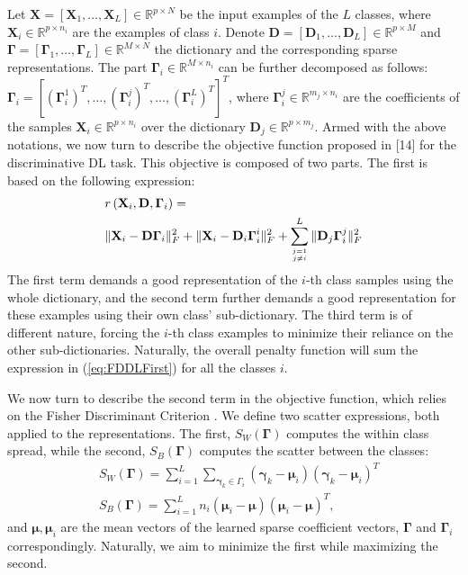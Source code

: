 \documentclass[journal]{IEEEtran}
\newcommand{\bD}{\mathbf{D}}
\newcommand{\bX}{\mathbf{X}}
\newcommand{\bGamma}{\boldsymbol{\Gamma}}
\newcommand{\bgamma}{\boldsymbol{\gamma}}
\newcommand{\bmu}{\boldsymbol{\mu}}
\begin{document}
Let $\bX = \left[\bX_1,\ldots,\bX_L\right] \in \mathbb{R}^{p \times N}$ be the input examples of the $L$ classes, where $\bX_i \in \mathbb{R}^{p \times n_i}$ are the examples of class $i$.
Denote $\bD=[\bD_1,\ldots,\bD_L]\in \mathbb{R}^{p \times M}$ and $\bGamma=[\bGamma_1,\ldots,\bGamma_L] \in \mathbb{R}^{M \times N}$ the dictionary and the corresponding sparse representations.
The part $\bGamma_i \in \mathbb{R}^{M \times n_i}$ can be further decomposed as follows: $\bGamma_i=[(\bGamma_i^1)^T,\ldots,(\bGamma_i^j)^T,\ldots,(\bGamma_i^L)^T]^T$, where $\bGamma_i^j \in \mathbb{R}^{m_j \times n_i}$ are the coefficients of the samples $\bX_i \in \mathbb{R}^{p \times n_i}$ over the dictionary $\bD_j \in \mathbb{R}^{p \times m_j}$.
Armed with the above notations, we now turn to describe the objective function proposed in [14] for the discriminative DL task. This objective is composed of two parts. The first
is based on the following expression:
\begin{equation} \label{eq:FDDLFirst}
\begin{split}
& r\left(\bX_i,\bD,\bGamma_i\right) = \\
& \|\bX_i - \bD \bGamma_i\|_F^2 + \|\bX_i - \bD_i \bGamma_i^i\|_F^2 + \sum_{j=1 \atop j \neq i}^L {\|\bD_j \bGamma_i^j\|_F^2}
\end{split}
\end{equation}
The first term demands a good representation of the $i$-th class samples using the whole dictionary, and the second term further demands a good representation for these examples using their own class' sub-dictionary. The third term is of different nature, forcing the $i$-th class examples to minimize their reliance on the other sub-dictionaries. Naturally, the overall penalty function will sum the expression in (\ref{eq:FDDLFirst}) for all the classes $i$.

We now turn to describe the second term in the objective function, which relies on the Fisher Discriminant Criterion \cite{FisherCriterion}. We define two scatter expressions, both applied to the representations. The first, $S_W(\bGamma)$ computes the within class spread, while the second, $S_B(\bGamma)$ computes the scatter between the classes:
\begin{equation}\label{eq:FDDLSecond}
\begin{split}
    & S_W(\bGamma) = \sum\nolimits_{i=1}^L{\sum\nolimits_{\bgamma_k \in \Gamma_i}{(\bgamma_k-\bmu_i)(\bgamma_k-\bmu_i)^T}} \\
    & S_B(\bGamma) = \sum\nolimits_{i=1}^L{n_i (\bmu_i-\bmu)(\bmu_i-\bmu)^T},
\end{split}
\end{equation}
and $\bmu,\bmu_i$ are the mean vectors of the learned sparse coefficient vectors, $\bGamma$ and $\bGamma_i$ correspondingly.  Naturally, we aim to minimize the first while maximizing the second.
\end{document}
